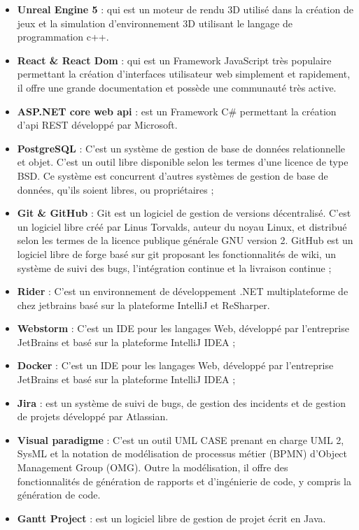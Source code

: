 \begin{itemize}
	\item \textbf{Unreal Engine 5} : qui est un moteur de rendu 3D utilisé dans la création de jeux et la simulation d'environnement 3D utilisant le langage de programmation c++.
	\item \textbf{React \& React Dom} : qui est un Framework JavaScript très populaire permettant la création d’interfaces utilisateur web simplement et rapidement, il offre une grande documentation et possède une communauté très active.
	\item \textbf{ASP.NET core web api} : est un Framework C\# permettant la création d’api REST développé par Microsoft.
	\item \textbf{PostgreSQL} : C’est un système de gestion de base de données relationnelle et objet. C'est un outil libre disponible selon les termes d'une licence de type BSD. Ce système est concurrent d'autres systèmes de gestion de base de données, qu'ils soient libres, ou propriétaires ;
	\item \textbf{Git \& GitHub} : Git est un logiciel de gestion de versions décentralisé. C'est un logiciel libre créé par Linus Torvalds, auteur du noyau Linux, et distribué selon les termes de la licence publique générale GNU version 2. GitHub est un logiciel libre de forge basé sur git proposant les fonctionnalités de wiki, un système de suivi des bugs, l’intégration continue et la livraison continue ;
	\item \textbf{Rider} : C’est un environnement de développement .NET multiplateforme de chez jetbrains basé sur la plateforme IntelliJ et ReSharper.
	\item \textbf{Webstorm} : C’est un IDE pour les langages Web, développé par l'entreprise JetBrains et basé sur la plateforme IntelliJ IDEA ;
	\item \textbf{Docker} : C’est un IDE pour les langages Web, développé par l'entreprise JetBrains et basé sur la plateforme IntelliJ IDEA ;
	\item \textbf{Jira} : est un système de suivi de bugs, de gestion des incidents et de gestion de projets développé par Atlassian.
	\item \textbf{Visual paradigme} : C’est un outil UML CASE prenant en charge UML 2, SysML et la notation de modélisation de processus métier (BPMN) d’Object Management Group (OMG). Outre la modélisation, il offre des fonctionnalités de génération de rapports et d’ingénierie de code, y compris la génération de code.
	\item \textbf{Gantt Project} : est un logiciel libre de gestion de projet écrit en Java.
\end{itemize}

